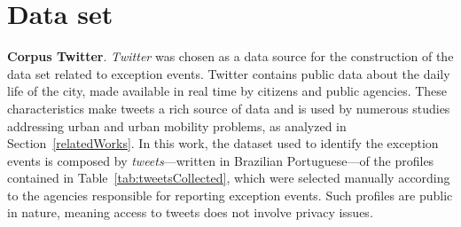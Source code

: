 \documentclass[runningheads]{llncs}
\begin{document}

\section{Data set}
\label{dataSet}
\textbf{Corpus Twitter}. \textit{Twitter} was chosen as a data source for the construction of the data set related to exception events. Twitter contains public data about the daily life of the city, made available in real time by citizens and public agencies. These characteristics make tweets a rich source of data and is used by numerous studies addressing urban and urban mobility problems, as analyzed in Section~\ref{relatedWorks}. In this work, the dataset used to identify the exception events is composed by \textit{tweets}---written in Brazilian Portuguese---of the profiles contained in Table~\ref{tab:tweetsCollected}, which were selected manually according to the agencies responsible for reporting exception events. Such profiles are public in nature, meaning access to tweets does not involve privacy issues.
\end{document}
